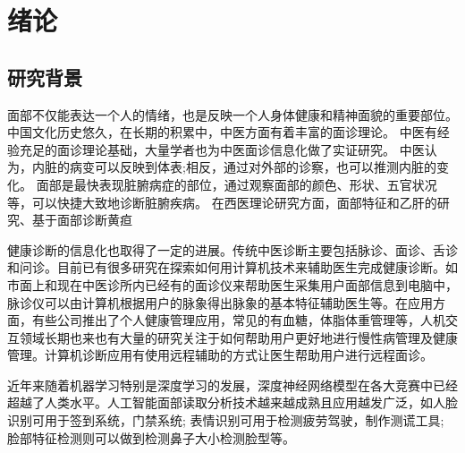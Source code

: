 \chapter{绪论}

\section{研究背景}

面部不仅能表达一个人的情绪，也是反映一个人身体健康和精神面貌的重要部位。
中国文化历史悠久，在长期的积累中，中医方面有着丰富的面诊理论。
中医有经验充足的面诊理论基础，大量学者也为中医面诊信息化做了实证研究。
中医认为，内脏的病变可以反映到体表;相反，通过对外部的诊察，也可以推测内脏的变化。
面部是最快表现脏腑病症的部位，通过观察面部的颜色、形状、五官状况等，可以快捷大致地诊断脏腑疾病。
在西医理论研究方面，面部特征和乙肝的研究\cite{杨宏志2007慢性乙型肝炎肝硬化中医面部五色诊断与临床病理的相关性研究}、基于面部诊断黄疸\cite{艾英1998黄疸病人面部色泽定量实验研究}


健康诊断的信息化也取得了一定的进展。传统中医诊断主要包括脉诊、面诊、舌诊和问诊。目前已有很多研究在探索如何用计算机技术来辅助医生完成健康诊断。如市面上和现在中医诊所内已经有的面诊仪来帮助医生采集用户面部信息到电脑中，脉诊仪可以由计算机根据用户的脉象得出脉象的基本特征辅助医生等\cite{Zhang2018Study2}。在应用方面，有些公司推出了个人健康管理应用，常见的有血糖，体脂体重管理等，人机交互领域长期也来也有大量的研究关注于如何帮助用户更好地进行慢性病管理及健康管理。计算机诊断应用有使用远程辅助的方式让医生帮助用户进行远程面诊。

近年来随着机器学习特别是深度学习的发展，深度神经网络模型在各大竞赛中已经超越了人类水平。人工智能面部读取分析技术越来越成熟且应用越发广泛，如人脸识别可用于签到系统，门禁系统; 表情识别可用于检测疲劳驾驶，制作测谎工具; 脸部特征检测则可以做到检测鼻子大小检测脸型等。

